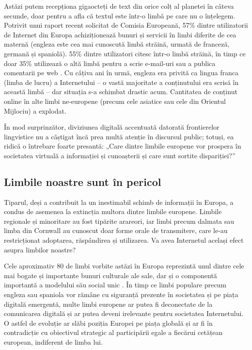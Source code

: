 \begin{multicols}{2}
Astăzi putem recepționa gigaocteți de text din orice colț al planetei în câteva secunde, doar pentru a afla că textul este într-o limbă pe care nu o înțelegem. Potrivit unui raport recent solicitat de Comisia Europeană, 57\% dintre utilizatorii de Internet din Europa achiziționează bunuri și servicii în limbi diferite de cea maternă (engleza este cea mai cunoscută limbă străină, urmată de franceză, germană și spaniolă). 55\% dintre utilizatori citesc într-o limbă străină, în timp ce doar 35\% utilizează o altă limbă pentru a scrie e-mail-uri sau a publica comentarii pe web \cite{EC1}. Cu câțiva ani în urmă, engleza era privită ca lingua franca (limba de lucru) a Internetului – o vastă majoritate a conținutului era scrisă în această limbă – dar situația s-a schimbat drastic acum. Cantitatea de conținut online în alte limbi ne-europene (precum cele asiatice sau cele din Orientul Mijlociu) a explodat.

În mod surprinzător, diviziunea digitală accentuată datorată frontierelor lingvistice nu a câștigat încă prea multă atenție în discursul public; totuși, ea ridică o întrebare foarte presantă: „Care dintre limbile europene vor prospera în societatea virtuală a informației și cunoașterii și care sunt sortite dispariției?”

\subsection{Limbile noastre sunt în pericol}

Tiparul, deși a contribuit la un inestimabil schimb de informații în Europa, a condus de asemenea la extincția multora dintre limbile europene. Limbile regionale și minoritare au fost tipărite arareori, iar limbi precum dalmata sau limba din Cornwall au cunoscut doar forme orale de transmitere, care le-au restricționat adoptarea, răspândirea și utilizarea. Va avea Internetul același efect asupra limbilor noastre?

Cele aproximativ 80 de limbi vorbite astăzi în Europa reprezintă unul dintre cele mai bogate și importante bunuri culturale ale sale, dar și o componentă importantă a modelului său social unic \cite{EC2}. În timp ce limbi populare precum engleza sau spaniola vor rămâne cu siguranță prezente în societatea și pe piața digitală emergentă, multe limbi europene ar putea fi deconectate de la comunicarea digitală și ar putea deveni irelevante pentru societatea Internetului. O astfel de evoluție ar slăbi poziția Europei pe piața globală și ar fi în contradicție cu obiectivul strategic al participării egale a fiecărui cetățean european, indiferent de limba lui. 


\end{multicols}
